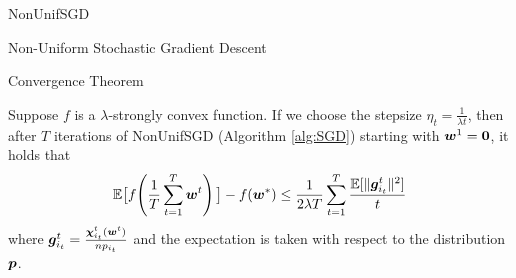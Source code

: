 \begin{frame}{NonUnifSGD}
\begin{algorithm}[H]
    \label{alg:SGD}
    \caption{Non-Uniform Stochastic Gradient Descent}
    \SetAlgoLined
\end{algorithm}
\end{frame}


\begin{frame}{Convergence Theorem}
\begin{theorem}
\label{theorem:basicSGD}
 Suppose $f$ is a $\lambda$-strongly convex function. If we choose the stepsize $\eta_t = \frac{1}{\lambda t }$, then after $T$ iterations of NonUnifSGD (Algorithm \ref{alg:SGD}) starting with $\bm{w}^{1}=\bm{0}$, it holds that
    \[
        \mathbb{E}\big[ f\!\left(\frac1T\sum_{t=1}^T \bm{w}^{t} \right) \big] - f(\bm{w}^*) \le \frac{1}{2\lambda T}\sum_{t=1}^T \frac{\mathbb{E}[\|\bm{g}_{i_t}^t\|^2]}{t}
    \]
    where $\bm{g}_{i_t}^t=\frac{\bm{\chi}_{i_t}^t(\bm{w}^{t})}{np_{i_t}}$ and the expectation is taken with respect to the distribution $\bm{p}$.
\end{theorem}
\end{frame}

